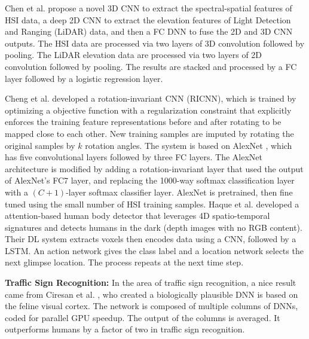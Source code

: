 \documentclass[12pt]{spieman}
\begin{document}
\begin{spacing}{1}
Chen et al. \cite{Chen2016DeepFusion} propose a novel 3D CNN to extract the spectral-spatial features of HSI data, a deep 2D CNN to extract the elevation features of Light Detection and Ranging (LiDAR) data, and then a FC DNN to fuse the 2D and 3D CNN outputs. The HSI data are processed via two layers of 3D convolution followed by pooling. The LiDAR elevation data are processed via two layers of 2D convolution followed by pooling. The results are stacked and processed by a FC layer followed by a logistic regression layer.

Cheng et al. \cite{Cheng2016Learning} developed a rotation-invariant CNN (RICNN), which is trained by optimizing a objective function with a regularization constraint that explicitly enforces the training feature representations before and after rotating to be mapped close to each other. New training samples are imputed by rotating the original samples by $k$ rotation angles. The system is based on AlexNet \cite{krizhevsky2012imagenet}, which has five convolutional layers followed by three FC layers. The AlexNet architecture is modified by adding a rotation-invariant layer that used the output of AlexNet's FC7 layer, and replacing the 1000-way softmax classification layer with a $(C+1)$-layer softmax classifier layer. AlexNet is pretrained, then fine tuned using the small number of HSI training samples. Haque et al. \cite{Haque2016} developed a attention-based human body detector that leverages 4D spatio-temporal signatures and detects humans in the dark (depth images with no RGB content). Their DL system extracts voxels then encodes data using a CNN, followed by a LSTM. An action network gives the class label and a location network selects the next glimpse location. The process repeats at the next time step.

\textbf{Traffic Sign Recognition:} In the area of traffic sign recognition, a nice result came from Ciresan et al. \cite{Ciresan2012} , who created a biologically plausible DNN is based on the feline visual cortex. The network is composed of multiple columns of DNNs, coded for parallel GPU speedup. The output of the columns is averaged. It outperforms humans by a factor of two in traffic sign recognition.


\end{spacing}
\end{document}
